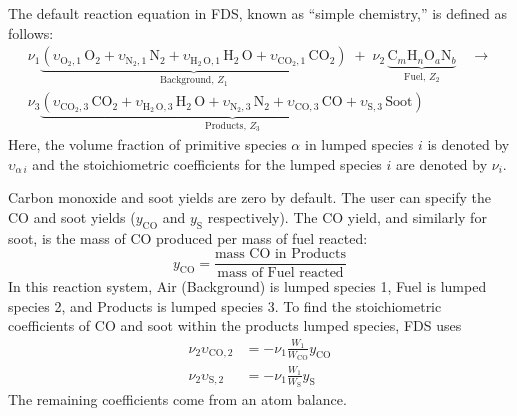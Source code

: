 The default reaction equation in FDS, known as ``simple chemistry,'' is defined as follows:
\begin{multline}\label{eq:full_lump}
\nu_{1}\underbrace{(\upsilon_{\mathrm{O}_{2},1} \, \mathrm{O}_2 +\upsilon_{\mathrm{N}_{2},1} \, \mathrm{N}_2 + \upsilon_{\mathrm{H}_{2} \, \mathrm{O},1} \, \mathrm{H}_2 \, \mathrm{O}+\upsilon_{\mathrm{CO}_{2},1} \, \mathrm{CO}_2)}_\text{Background,~$Z_1$} \; + \; \nu_{2} \, \underbrace{\mbox{C}_m\mbox{H}_n\mbox{O}_a\mbox{N}_b}_\text{Fuel,~$Z_2$} \quad \longrightarrow \\
\nu_{3}\underbrace{(\upsilon_{\mathrm{CO}_{2},3} \, \mathrm{CO}_2 + \upsilon_{\mathrm{H}_{2} \, \mathrm{O},3} \, \mathrm{H}_2 \, \mathrm{O} + \upsilon_{\mathrm{N}_{2},3} \, \mathrm{N}_2+\upsilon_{\mathrm{CO},3} \, \mathrm{CO} + \upsilon_{\mathrm{S},3} \, \mathrm{Soot})}_\text{Products,~$Z_3$}
\end{multline}
Here, the volume fraction of primitive species $\alpha$ in lumped species $i$ is denoted by $\upsilon_{\alpha\,i}$ and the stoichiometric coefficients for the lumped species $i$ are denoted by $\nu_{i}$.

Carbon monoxide and soot yields are zero by default. The user can specify the CO and soot yields ($y_{\mathrm{CO}}$ and $y_{\mathrm{S}}$ respectively). The CO yield, and similarly for soot, is the mass of CO produced per mass of fuel reacted:
\begin{equation}\label{eq:y_co}
y_\mathrm{CO} = \frac{\mbox{mass CO in Products}}{\mbox{mass of Fuel reacted}}
\end{equation}
In this reaction system, Air (Background) is lumped species 1, Fuel is lumped species 2, and Products is lumped species 3. To find the stoichiometric coefficients of CO and soot within the products lumped species, FDS uses
\begin{align}\label{eq:yields}
\nu_{2}\upsilon_{\mathrm{CO},2}&=-\nu_{1}\frac{W_1}{W_{\mathrm{CO}}}y_{\mathrm{CO}} \\
\nu_{2}\upsilon_{\mathrm{S},2}&=-\nu_{1}\frac{W_1}{W_{\mathrm{S}}}y_{\mathrm{S}}
\end{align}
The remaining coefficients come from an atom balance.

